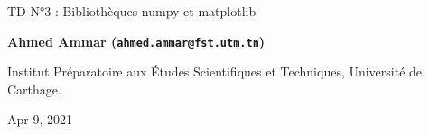 \documentclass[%
oneside,                 %
final,                   %
10pt,french]{article}
\begin{document}

\newcommand{\exercisesection}[1]{\subsection*{#1}}






\thispagestyle{empty}

\begin{center}
{\LARGE\bf
\begin{spacing}{1.25}
TD N°3 : Bibliothèques numpy et matplotlib
\end{spacing}
}
\end{center}


\begin{center}
{\bf Ahmed Ammar (\texttt{ahmed.ammar@fst.utm.tn})}
\end{center}

    \begin{center}
\centerline{{\small Institut Préparatoire aux Études Scientifiques et Techniques, Université de Carthage.}}
\end{center}
    

\begin{center}
Apr 9, 2021
\end{center}

\vspace{1cm}


\tableofcontents


\vspace{1cm} %




\end{document}
